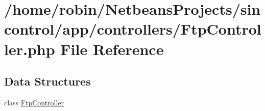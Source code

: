 \hypertarget{_ftp_controller_8php}{}\section{/home/robin/\+Netbeans\+Projects/sincontrol/app/controllers/\+Ftp\+Controller.php File Reference}
\label{_ftp_controller_8php}
\subsection*{Data Structures}
\begin{DoxyCompactItemize}
\item 
class \hyperlink{class_ftp_controller}{Ftp\+Controller}
\end{DoxyCompactItemize}
